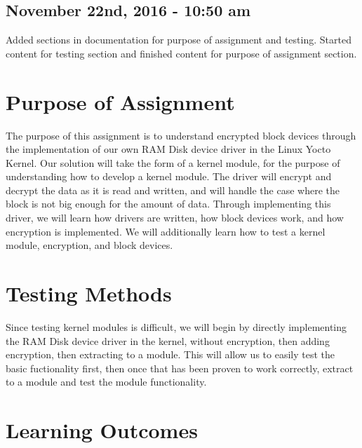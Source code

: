 \documentclass[letterpaper,10pt]{article}
\begin{document}
\subsection{November 22nd, 2016 - 10:50 am}
Added sections in documentation for purpose of assignment and testing. Started content for testing 
section and finished content for purpose of assignment section.

\section{Purpose of Assignment}
The purpose of this assignment is to understand encrypted block devices through the implementation of 
our own RAM Disk device driver in the Linux Yocto Kernel. 
Our solution will take the form of a kernel module, for the purpose of understanding how to develop a 
kernel module. 
The driver will encrypt and decrypt the data as it is read and written, and will handle the case where 
the block is not big enough for the amount of data. 
Through implementing this driver, we will learn how drivers are written, how block devices work, and 
how encryption is implemented. 
We will additionally learn how to test a kernel module, encryption, and block devices.

\section{Testing Methods}
Since testing kernel modules is difficult, we will begin by directly implementing the RAM Disk device 
driver in the kernel, without encryption, then adding encryption, then extracting to a module. 
This will allow us to easily test the basic fuctionality first, then once that has been proven to work 
correctly, extract to a module and test the module functionality.

\section{Learning Outcomes}
\end{document}
